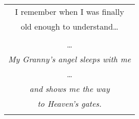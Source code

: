 \documentclass{article}
\begin{document}
\begin{center}
\begin{tabular}{c}
\\
I remember when I was finally \\
old enough to understand\ldots{} \\
\\
\ldots{} \\
\textit{My Granny's angel sleeps with me} \\
\ldots{} \\
\textit{and shows me the way} \\
\textit{to Heaven's gates.} \\
\\
\end{tabular}
\end{center}
\vspace{3ex}
\end{document}
